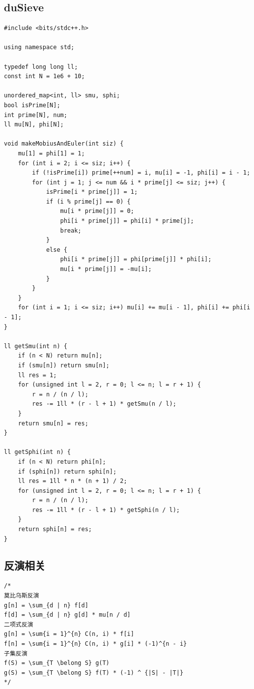 \documentclass[twoside]{article}
\begin{document}
\subsection{duSieve}
\begin{lstlisting}
#include <bits/stdc++.h>

using namespace std;

typedef long long ll;
const int N = 1e6 + 10;

unordered_map<int, ll> smu, sphi;
bool isPrime[N];
int prime[N], num;
ll mu[N], phi[N];

void makeMobiusAndEuler(int siz) {
    mu[1] = phi[1] = 1;
    for (int i = 2; i <= siz; i++) {
        if (!isPrime[i]) prime[++num] = i, mu[i] = -1, phi[i] = i - 1;
        for (int j = 1; j <= num && i * prime[j] <= siz; j++) {
            isPrime[i * prime[j]] = 1;
            if (i % prime[j] == 0) {
                mu[i * prime[j]] = 0;
                phi[i * prime[j]] = phi[i] * prime[j];
                break;
            }
            else {
                phi[i * prime[j]] = phi[prime[j]] * phi[i];
                mu[i * prime[j]] = -mu[i];
            }
        }
    }
    for (int i = 1; i <= siz; i++) mu[i] += mu[i - 1], phi[i] += phi[i - 1];
}

ll getSmu(int n) {
    if (n < N) return mu[n];
    if (smu[n]) return smu[n];
    ll res = 1;
    for (unsigned int l = 2, r = 0; l <= n; l = r + 1) {
        r = n / (n / l);
        res -= 1ll * (r - l + 1) * getSmu(n / l);
    }
    return smu[n] = res;
}

ll getSphi(int n) {
    if (n < N) return phi[n];
    if (sphi[n]) return sphi[n];
    ll res = 1ll * n * (n + 1) / 2;
    for (unsigned int l = 2, r = 0; l <= n; l = r + 1) {
        r = n / (n / l);
        res -= 1ll * (r - l + 1) * getSphi(n / l);
    }
    return sphi[n] = res;
}
\end{lstlisting}
\subsection{反演相关}
\begin{lstlisting}
/*
莫比乌斯反演
g[n] = \sum_{d | n} f[d]
f[d] = \sum_{d | n} g[d] * mu[n / d]
二项式反演
g[n] = \sum{i = 1}^{n} C(n, i) * f[i]
f[n] = \sum{i = 1}^{n} C(n, i) * g[i] * (-1)^{n - i}
子集反演
f(S) = \sum_{T \belong S} g(T)
g(S) = \sum_{T \belong S} f(T) * (-1) ^ {|S| - |T|}
*/
\end{lstlisting}
\end{document}
